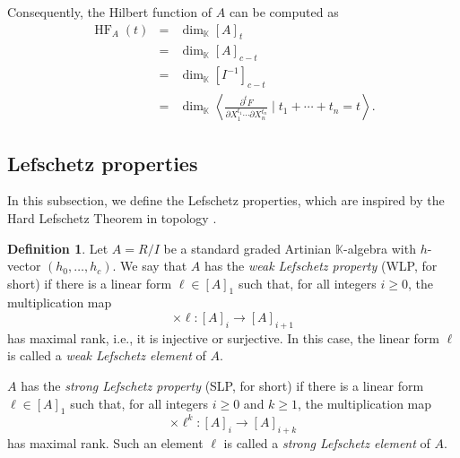 \documentclass[12pt,twoside]{amsart}
\numberwithin{equation}{section} \hyphenation{semi-stable}
\newcommand{\K}{\mathbb{K}}
\DeclareMathOperator{\HF}{HF}
\theoremstyle{definition}
\newtheorem{definition}[theorem]{Definition}
\begin{document}
Consequently, the Hilbert function of $A$ can be computed as
\begin{equation}
    \label{computingHilbertFunctionGorenstein}
\begin{array}{lcl}
    \HF_A(t) &= &\dim_{\K}[A]_t \\
    &= &\dim_{\K}[A]_{c-t} \\
    & =&\dim_{\K}[I^{-1}]_{c-t}  \\
    &= &\dim_{\K} \left\langle \frac{\partial ^{t}F}{\partial X_1^{t_1}\cdots \partial X_n^{t_n}} \mid t_1+\cdots +t_n= t
    \right\rangle .
\end{array}
\end{equation}

\subsection{Lefschetz properties}

In this subsection, we define the Lefschetz properties, which are inspired by the 
Hard Lefschetz Theorem in topology \cite{S80}.

\begin{definition}\label{def_wlp}
Let $A=R/I$ be a standard graded Artinian $\K$-algebra with $h$-vector $(h_0,\dots,h_c)$. We say that $A$ has the \emph{weak Lefschetz property} (WLP, for short)
if there is a linear form $\ell \in [A]_1$ such that, for all
integers $i\ge0$, the multiplication map
\[
 \times \ell: [A]_{i} \longrightarrow [A]_{i+1} 
\]
has maximal rank, i.e., it is injective or surjective. 
In this case, the linear form $\ell$ is called a \emph{weak Lefschetz element} of $A$. 

$A$ has the \emph{strong Lefschetz property} (SLP, for short) if there is a linear form $\ell \in [A]_1$ such that, for all
integers $i\ge0$ and $k\ge 1$, the multiplication map
\[
 \times \ell^k: [A]_{i} \longrightarrow [A]_{i+k} 
\]
has maximal rank. Such an element $\ell$ is called a \emph{strong Lefschetz element} of $A$.

\end{definition}
\end{document}
